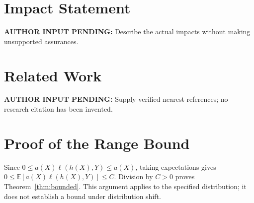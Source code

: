 \documentclass{article}\usepackage{microtype,graphicx,booktabs,hyperref}
\newcommand{\AuthorPending}[1]{\textbf{AUTHOR INPUT PENDING:} #1}
\begin{document}
\printAffiliationsAndNotice{}
\begin{abstract}
We examine a fixed confidence gate for selective classification using a synthetic
evaluation fixture. The gate abstains from predictions below a specified confidence
threshold. We report accuracy among accepted predictions alongside coverage on two
synthetic datasets. Conditional accuracy increases on one dataset and decreases on
the other; these observations do not establish an overall accuracy improvement.
A range bound for selective risk requires positive coverage and bounded loss.
Statistical uncertainty, runtime, and distribution shift remain unevaluated.
\end{abstract}

\section*{Impact Statement}\AuthorPending{Describe the actual impacts without making unsupported assurances.}

\section*{Related Work}
\AuthorPending{Supply verified nearest references; no research citation has been invented.}
\clearpage
\appendix
\section{Proof of the Range Bound}\label{app:proof}
Since $0\leq a(X)\ell(h(X),Y)\leq a(X)$, taking expectations gives
$0\leq\mathbb{E}[a(X)\ell(h(X),Y)]\leq C$. Division by $C>0$ proves
Theorem~\ref{thm:bounded}. This argument applies to the specified distribution;
it does not establish a bound under distribution shift.
\end{document}

